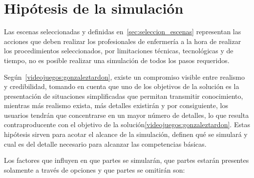 \section{Hipótesis de la simulación}
\label{sec:hipotesis}

Las escenas seleccionadas y definidas en~\ref{sec:seleccion_escenas}
representan las acciones que deben realizar los profesionales de enfermería
a la hora de realizar los procedimientos seleccionados, por limitaciones
técnicas, tecnológicas y de tiempo, no es posible realizar una simulación
de todos los pasos requeridos.


Según~\ref{videojuegos:gonzaleztardon}, existe un compromiso visible entre
realismo y credibilidad, tomando en cuenta que uno de los objetivos de la
solución es la presentación de situaciones simplificadas que permitan transmitir
conocimiento, mientras más realismo exista, más detalles existirán y por
consiguiente, los usuarios tendrán que concentrarse en un mayor número de
detalles, lo que resulta contraproducente con el objetivo de la
solución\ref{videojuegos:gonzaleztardon}. Estas hipótesis sirven para acotar el
alcance de la simulación, definen qué se simulará y cual es del detalle
necesario para alcanzar las competencias básicas.

Los factores que influyen en que partes se simularán, que partes estarán
presentes solamente a través de opciones y que partes se omitirán son:

